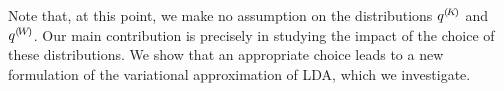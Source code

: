 Note that, at this point, we make no assumption on the distributions ${q}^{(\!{K}\!)}$ and ${q}^{(\!{W}\!)}$. Our main contribution is precisely in studying the impact of the choice of these distributions. We show that an appropriate choice leads to a new formulation of the variational approximation of LDA, which we investigate.